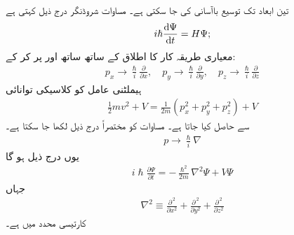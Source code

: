 تین ابعاد تک توسیع  باآسانی کی جا سکتی ہے۔ مساوات شروڈنگر درج ذیل کہتی ہے
\begin{align}
i\hslash\frac{\dif{\Psi}}{\dif{t}}=H\Psi;
\end{align}
معیاری طریقہ کار کا اطلاق   کے ساتھ ساتھ  اور  پر  کر کے:
\begin{align}\label{مساوات_تین_ابعاد_عاملین_الف}
p_{x}\to \frac{\hslash}{i}\frac{\partial}{\partial{x}},\quad p_{y}\to \frac{\hslash}{i}\frac{\partial}{\partial{y}},\quad p_{z}\to \frac{\hslash}{i}\frac{\partial}{\partial{z}} 
\end{align}
ہیملٹنی عامل  کو کلاسیکی توانائی
\begin{align*}
\frac{1}{2}mv^{2}+V=\frac{1}{2m}(p_{x}^{2}+p_{y}^{2}+p_{z}^{2})+V
\end{align*}
سے حاصل کیا جاتا ہے۔ مساوات  کو مختصراً درج ذیل لکھا  جا سکتا ہے۔
\begin{align}
p\to \frac{\hslash}{i}\nabla
\end{align}
یوں درج ذیل ہو گا
\begin{align}
i\hslash\frac{\partial{\Psi}}{\partial{t}}=-\frac{\hslash^{2}}{2m}\nabla^{2}\Psi+V\Psi
\end{align}
جہاں
\begin{align}
\nabla^{2}\equiv \frac{\partial^{\,2}}{\partial{x^2}}+\frac{\partial^{\,2}}{\partial{y^2}}+\frac{\partial^{\,2}}{\partial{z^2}} 
\end{align}
کارتیسی محدد میں  ہے۔

